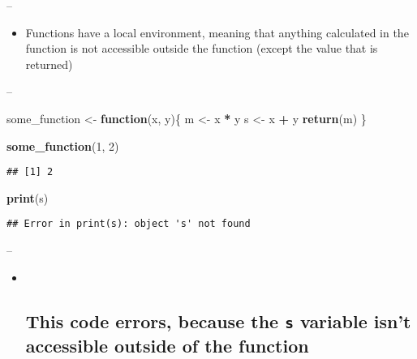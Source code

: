 \documentclass[]{article}
\newenvironment{Shaded}{\begin{snugshade}}{\end{snugshade}}
\newcommand{\ControlFlowTok}[1]{\textcolor[rgb]{0.13,0.29,0.53}{\textbf{#1}}}
\newcommand{\DecValTok}[1]{\textcolor[rgb]{0.00,0.00,0.81}{#1}}
\newcommand{\KeywordTok}[1]{\textcolor[rgb]{0.13,0.29,0.53}{\textbf{#1}}}
\newcommand{\NormalTok}[1]{#1}
\newcommand{\OperatorTok}[1]{\textcolor[rgb]{0.81,0.36,0.00}{\textbf{#1}}}
\newcommand{\StringTok}[1]{\textcolor[rgb]{0.31,0.60,0.02}{#1}}
\providecommand{\tightlist}{%
  \setlength{\itemsep}{0pt}\setlength{\parskip}{0pt}}
\begin{document}
--

\begin{itemize}
\tightlist
\item
  Functions have a local environment, meaning that anything calculated
  in the function is not accessible outside the function (except the
  value that is returned)
\end{itemize}

--

\begin{Shaded}
\begin{Highlighting}[]
\NormalTok{some_function <-}\StringTok{ }\ControlFlowTok{function}\NormalTok{(x, y)\{}
\NormalTok{  m <-}\StringTok{ }\NormalTok{x }\OperatorTok{*}\StringTok{ }\NormalTok{y}
\NormalTok{  s <-}\StringTok{ }\NormalTok{x }\OperatorTok{+}\StringTok{ }\NormalTok{y}
  \KeywordTok{return}\NormalTok{(m)}
\NormalTok{\}}

\KeywordTok{some_function}\NormalTok{(}\DecValTok{1}\NormalTok{, }\DecValTok{2}\NormalTok{)}
\end{Highlighting}
\end{Shaded}

\begin{verbatim}
## [1] 2
\end{verbatim}

\begin{Shaded}
\begin{Highlighting}[]
\KeywordTok{print}\NormalTok{(s)}
\end{Highlighting}
\end{Shaded}

\begin{verbatim}
## Error in print(s): object 's' not found
\end{verbatim}

--

\begin{itemize}
\item ~
  \hypertarget{this-code-errors-because-the-s-variable-isnt-accessible-outside-of-the-function}{%
  \subsection{\texorpdfstring{This code errors, because the \texttt{s}
  variable isn't accessible outside of the
  function}{This code errors, because the s variable isn't accessible outside of the function}}\label{this-code-errors-because-the-s-variable-isnt-accessible-outside-of-the-function}}
\end{itemize}
\end{document}
